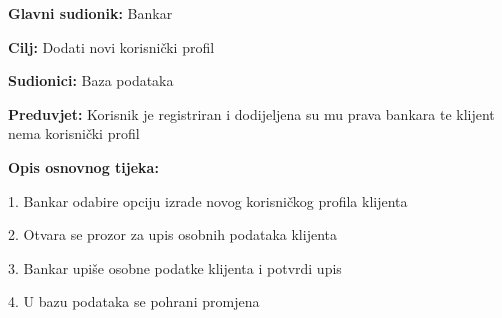 			\noindent {}
\begin{packed_item}

  \item \textbf{Glavni sudionik: }Bankar
  \item  \textbf{Cilj:} Dodati novi korisnički profil
  \item  \textbf{Sudionici:} Baza podataka
  \item  \textbf{Preduvjet:} Korisnik je registriran i dodijeljena su mu prava bankara te klijent nema korisnički profil
  \item  \textbf{Opis osnovnog tijeka:}
  
  \item[] \begin{packed_enum}

    \item 1. Bankar odabire opciju izrade novog korisničkog profila klijenta
    \item 2. Otvara se prozor za upis osobnih podataka klijenta
    \item 3. Bankar upiše osobne podatke klijenta i potvrdi upis
    \item 4. U bazu podataka se pohrani promjena
  \end{packed_enum}
  
  
 
    

\end{packed_item}


